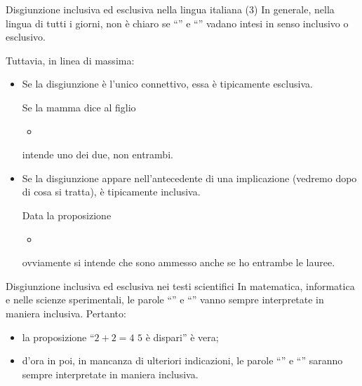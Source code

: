 \documentclass[aspectratio=169,10pt,dvipsnames,handout]{beamer}
\begin{document}
\begin{frame}{Disgiunzione inclusiva ed esclusiva nella lingua italiana (3)}
    In generale, nella lingua di tutti i giorni, non è chiaro se ``''  e ``'' vadano intesi in senso inclusivo o esclusivo.

    \medskip
    Tuttavia, in linea di massima:
    \begin{itemize}
        \item Se la disgiunzione è l'unico connettivo, essa è tipicamente esclusiva.

              \medskip
              Se la mamma dice al figlio
              \begin{itemize}
                  \item {}
              \end{itemize}
              intende uno dei due, non entrambi.

              \pause
        \item Se la disgiunzione appare nell'antecedente di una implicazione (vedremo dopo di cosa si tratta), è tipicamente inclusiva.

              \medskip
              Data la proposizione
              \begin{itemize}
                  \item {}
              \end{itemize}
              ovviamente si intende che sono ammesso anche se ho entrambe le lauree.
    \end{itemize}
\end{frame}

\begin{frame}{Disgiunzione inclusiva ed esclusiva nei testi scientifici}
    In matematica, informatica e nelle scienze sperimentali, le parole ``'' e ``'' vanno sempre interpretate in maniera inclusiva. Pertanto:
    \begin{itemize}
        \item la proposizione ``$2 + 2 = 4$  $5$ è dispari'' è vera;
        \item d'ora in poi, in mancanza di ulteriori indicazioni, le parole ``'' e ``'' saranno sempre interpretate in maniera inclusiva.
    \end{itemize}
\end{frame}
\end{document}
